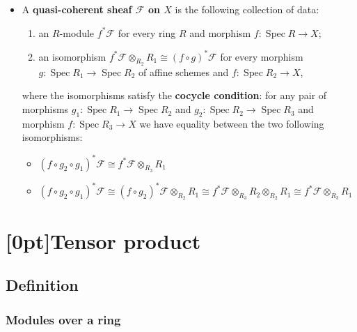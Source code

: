 \documentclass[10pt]{article}
\DeclareMathOperator{\spec}{Spec}
\newcommand{\CT}{\textcolor{orange}{CT}}
\newcommand{\HA}{\textcolor{cyan}{HA}}
\newcommand{\AT}{\textcolor{violet}{AT}}
\begin{document}
            \begin{itemize}
                \item A \textbf{quasi-coherent sheaf $\mathcal{F}$ on $X$} is the following collection of data:
                    \begin{enumerate}
                        \item an $R$-module $f^*\mathcal{F}$ for every ring $R$ and morphism $f\colon\spec R\to X$;
                        \item an isomorphism $f^*\mathcal{F}\otimes_{R_2}R_1\cong(f\circ g)^*\mathcal{F}$ for every morphism $g\colon\spec R_1\to\spec R_2$ of affine schemes and $f\colon\spec R_2\to X$,
                    \end{enumerate}
                    where the isomorphisms satisfy the \textbf{cocycle condition}: for any pair of morphisms $g_1\colon\spec R_1\to\spec R_2$ and $g_2\colon\spec R_2\to\spec R_3$ and morphism $f\colon\spec R_3\to X$ we have equality between the two following isomorphisms:
                        \begin{itemize}
                            \item $(f\circ g_2\circ g_1)^*\mathcal{F} \cong f^*\mathcal{F}\otimes_{R_3}R_1$
                            \item $(f\circ g_2\circ g_1)^*\mathcal{F} \cong (f\circ g_2)^*\mathcal{F}\otimes_{R_2}R_1 \cong f^*\mathcal{F}\otimes_{R_3}R_2\otimes_{R_2}R_1 \cong f^*\mathcal{F}\otimes_{R_3}R_1$
                        \end{itemize}
            \end{itemize}




    \section{\protect\marginnote{\CT~\HA~\AT}[0pt]Tensor product}

        \subsection{Definition}

            \subsubsection{Modules over a ring}
\end{document}
